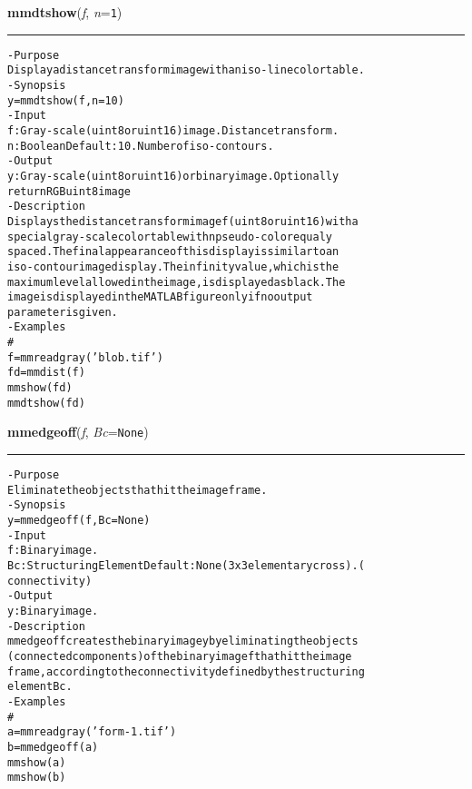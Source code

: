     \label{multireg:num_pymorph:mmdtshow}
    \vspace{0.5ex}

    \begin{boxedminipage}{\textwidth}

    \raggedright \textbf{mmdtshow}(\textit{f}, \textit{n}=\texttt{1\-})

    \vspace{-1.5ex}

    \rule{\textwidth}{0.5\fboxrule}
\begin{alltt}
- Purpose
    Display a distance transform image with an iso-line color table.
- Synopsis
    y = mmdtshow(f, n=10)
- Input
    f: Gray-scale (uint8 or uint16) image. Distance transform.
    n: Boolean Default: 10. Number of iso-contours.
- Output
    y: Gray-scale (uint8 or uint16) or binary image. Optionally
       return RGB uint8 image
- Description
    Displays the distance transform image f (uint8 or uint16) with a
    special gray-scale color table with n pseudo-color equaly
    spaced. The final appearance of this display is similar to an
    iso-contour image display. The infinity value, which is the
    maximum level allowed in the image, is displayed as black. The
    image is displayed in the MATLAB figure only if no output
    parameter is given.
- Examples
    \#
    f=mmreadgray('blob.tif')
    fd=mmdist(f)
    mmshow(fd)
    mmdtshow(fd)\end{alltt}

    \vspace{1ex}

    \end{boxedminipage}

    \label{multireg:num_pymorph:mmedgeoff}
    \vspace{0.5ex}

    \begin{boxedminipage}{\textwidth}

    \raggedright \textbf{mmedgeoff}(\textit{f}, \textit{Bc}=\texttt{N\-o\-n\-e\-})

    \vspace{-1.5ex}

    \rule{\textwidth}{0.5\fboxrule}
\begin{alltt}
- Purpose
    Eliminate the objects that hit the image frame.
- Synopsis
    y = mmedgeoff(f, Bc=None)
- Input
    f:  Binary image.
    Bc: Structuring Element Default: None (3x3 elementary cross). (
        connectivity)
- Output
    y: Binary image.
- Description
    mmedgeoff creates the binary image y by eliminating the objects
    (connected components) of the binary image f that hit the image
    frame, according to the connectivity defined by the structuring
    element Bc .
- Examples
    \#
    a=mmreadgray('form-1.tif')
    b=mmedgeoff(a)
    mmshow(a)
    mmshow(b)\end{alltt}

    \vspace{1ex}

    \end{boxedminipage}

